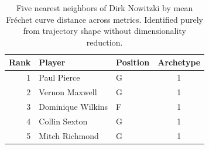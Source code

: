 \begin{table}[htbp]
  \centering\small
  \begin{tabular}{rllc}
    \toprule
    Rank & Player & Position & Archetype \\
    \midrule
    1 & Paul Pierce & G & 1 \\
    2 & Vernon Maxwell & G & 1 \\
    3 & Dominique Wilkins & F & 1 \\
    4 & Collin Sexton & G & 1 \\
    5 & Mitch Richmond & G & 1 \\
    \bottomrule
  \end{tabular}
  \caption{Five nearest neighbors of Dirk Nowitzki by mean Fr\'{e}chet curve distance across metrics. Identified purely from trajectory shape without dimensionality reduction.}
  \label{tab:Dirk_Nowitzki_frechet_curve_neighbors}
\end{table}


